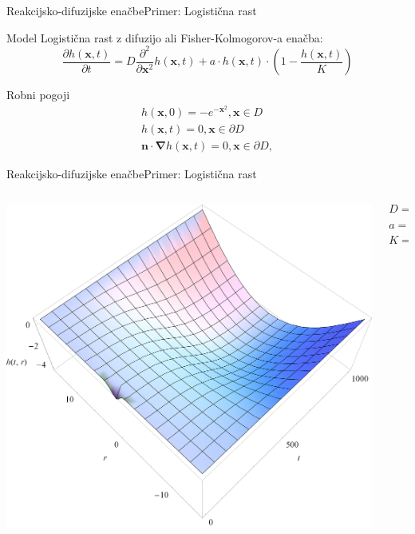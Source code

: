 \documentclass{beamer}
\begin{document}
\begin{frame}{Reakcijsko-difuzijske enačbe}{Primer: Logistična rast}
\begin{block}{Model}
  Logistična rast z difuzijo ali Fisher-Kolmogorov-a enačba:
  \begin{equation}  \frac{ \partial h(\mathbf{x},t) }{ \partial t} = D \frac{\partial^2}{\partial \mathbf{x}^2} h(\mathbf{x},t) + a \cdot h(\mathbf{x},t) \cdot (1 - \frac{h(\mathbf{x},t)}{K}) \end{equation} 
\end{block}
\begin{block}{Robni pogoji}
    \begin{equation}
      \begin{aligned}
        h(\mathbf{x},0) =  - e^{-\mathbf{x}^2}, \mathbf{x} \in D \\
        h(\mathbf{x},t) = 0, \mathbf{x} \in \partial D \\
        \mathbf{n} \cdot \boldsymbol \nabla h(\mathbf{x},t) = 0, \mathbf{x} \in \partial D,
      \end{aligned}
    \end{equation}
\end{block}
\end{frame}

\begin{frame}{Reakcijsko-difuzijske enačbe}{Primer: Logistična rast}
\begin{columns}
  \begin{column}{0.8\textwidth}
    \includegraphics[width=1.05\textwidth]{slike/difuzija-logisticna-rast2.png}
  \end{column}
  \begin{column}{0.3\textwidth}
    \footnotesize
    \[ D = 1 \]
    \[ a = \frac{1}{50} \]
    \[ K = -10 \]
  \end{column}
\end{columns}
\end{frame}
\end{document}
